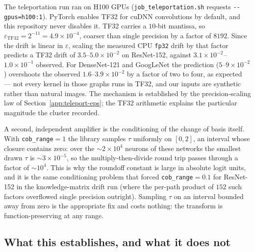 The teleportation run ran on H100 GPUs (\texttt{job\_teleportation.sh} requests
\texttt{-{}-gpus=h100:1}). PyTorch enables TF32 for cuDNN convolutions by
default, and this repository never disables it. TF32 carries a $10$-bit
mantissa, so $\varepsilon_{\mathrm{TF32}}=2^{-11}=4.9\times10^{-4}$, coarser
than single precision by a factor of $8192$. Since the drift is linear in
$\varepsilon$, scaling the measured CPU \texttt{fp32} drift by that factor
predicts a TF32 drift of $3.5$--$5.0\times10^{-2}$ on ResNet-152, against
$3.1\times10^{-2}$--$1.0\times10^{-1}$ observed. For DenseNet-121 and GoogLeNet
the prediction ($5$--$9\times10^{-2}$) overshoots the observed
$1.6$--$3.9\times10^{-2}$ by a factor of two to four, as expected --- not every
kernel in those graphs runs in TF32, and our inputs are synthetic rather than
natural images. The mechanism is established by the precision-scaling law of
Section~\ref{app:teleport-eps}; the TF32 arithmetic explains the particular
magnitude the cluster recorded.

A second, independent amplifier is the conditioning of the change of basis
itself. With \texttt{cob\_range}$=1$ the library samples $\tau$ uniformly on
$[0,2]$, an interval whose closure contains zero: over the $\sim\!2\times10^{4}$
neurons of these networks the smallest drawn $\tau$ is $\sim\!3\times10^{-5}$,
so the multiply-then-divide round trip passes through a factor of $\sim\!10^{4}$.
This is why the roundoff constant is large in absolute logit units, and it is the
same conditioning problem that forced \texttt{cob\_range}$=0.1$ for ResNet-152 in
the knowledge-matrix drift run (where the per-path product of $152$ such factors
overflowed single precision outright). Sampling $\tau$ on an interval bounded
away from zero is the appropriate fix and costs nothing: the transform is
function-preserving at any range.

\subsection{What this establishes, and what it does not}
\label{app:teleport-consequences}

